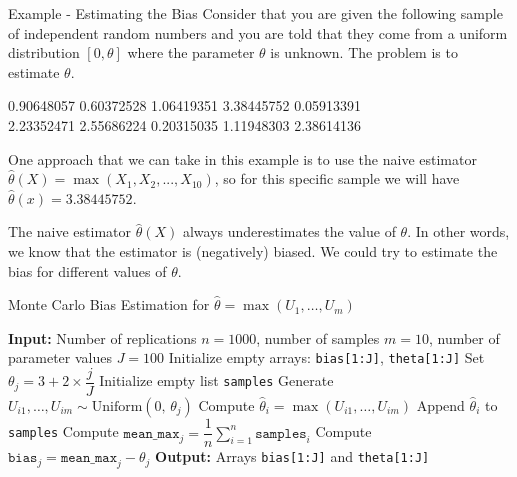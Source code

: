 \documentclass[8pt]{beamer}
\begin{document}
\begin{frame}{Example - Estimating the Bias} 
Consider that you are given the following sample of independent random numbers and you are told that they come from a uniform distribution $[0, \theta]$ where the parameter $\theta$ is unknown. The problem is to estimate $\theta$.
\vspace{2mm}

0.90648057    \hspace{1mm} 0.60372528  \hspace{1mm}
1.06419351   \hspace{1mm} 3.38445752  \hspace{1mm}
0.05913391 \hspace{1mm} \\
2.23352471 \hspace{1mm}
2.55686224 \hspace{1mm}  0.20315035 \hspace{1mm}
1.11948303 \hspace{1mm} 2.38614136
\vspace{2mm}
\pause

One approach that we can take in this example is to use the naive estimator $\hat{\theta}(X)=\max(X_1,X_2,...,X_{10})$, so for this specific sample we will have $\hat{\theta}(x)=3.38445752$.
\vspace{2mm}

The naive estimator  $\hat{\theta}(X)$ always underestimates the value of $\theta$. In other words, we know that the estimator is (negatively) biased. We could try to estimate the bias for different values of $\theta$.
\end{frame}

\begin{frame}[fragile]
\begin{algorithm}[H]
\caption{Monte Carlo Bias Estimation for $\hat{\theta} = \max(U_1, \ldots, U_m)$}
\begin{algorithmic}[1]
  \State \textbf{Input:} Number of replications $n = 1000$, number of samples $m = 10$, number of parameter values $J = 100$
  \State Initialize empty arrays: \texttt{bias[1:J]}, \texttt{theta[1:J]}
    \State Set $\theta_j = 3 + 2 \times \dfrac{j}{J}$
    \State Initialize empty list \texttt{samples}
      \State Generate $U_{i1}, \ldots, U_{im} \sim \text{Uniform}(0,\, \theta_j)$
      \State Compute $\hat{\theta}_i = \max(U_{i1}, \ldots, U_{im})$
      \State Append $\hat{\theta}_i$ to \texttt{samples}
    \EndFor
    \State Compute $\texttt{mean\_max}_j = \dfrac{1}{n} \sum_{i=1}^n \texttt{samples}_i$
    \State Compute $\texttt{bias}_j = \texttt{mean\_max}_j - \theta_j$
  \EndFor
  \State \textbf{Output:} Arrays \texttt{bias[1:J]} and \texttt{theta[1:J]}
\end{algorithmic}
\end{algorithm}
\end{frame}
\end{document}
